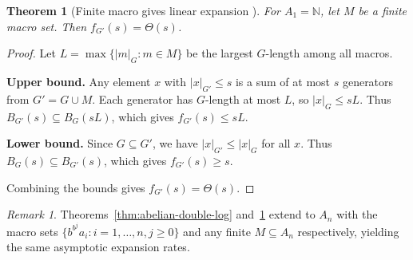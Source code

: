\documentclass[12pt]{amsart}
\newtheorem{theorem}{Theorem}
\theoremstyle{definition}
\theoremstyle{remark}
\newtheorem{remark}{Remark}
\begin{document}
\begin{theorem}[Finite macro gives linear expansion ]\label{thm:abelian-finite}
For $A_1 = \mathbb{N}$, let $M$ be a finite macro set.
Then $f_{G'}(s) = \Theta(s)$.
\end{theorem}

\begin{proof}
Let $L = \max\{|m|_G : m \in M\}$ be the largest $G$-length among all macros.

\textbf{Upper bound.}
Any element $x$ with $|x|_{G'} \leq s$ is a sum of at most $s$ generators from $G' = G \cup M$.
Each generator has $G$-length at most $L$, so $|x|_G \leq sL$.
Thus $B_{G'}(s) \subseteq B_G(sL)$, which gives $f_{G'}(s) \leq sL$.

\textbf{Lower bound.}
Since $G \subseteq G'$, we have $|x|_{G'} \leq |x|_G$ for all $x$.
Thus $B_G(s) \subseteq B_{G'}(s)$, which gives $f_{G'}(s) \geq s$.


Combining the bounds gives $f_{G'}(s) = \Theta(s)$.
\end{proof}

\begin{remark}
Theorems~\ref{thm:abelian-double-log} and~\ref{thm:abelian-finite} extend to $A_n$ with the macro sets $\{b^{b^j} a_i : i = 1, \ldots, n, j \geq 0\}$ and any finite $M \subseteq A_n$ respectively, yielding the same asymptotic expansion rates.
\end{remark}
\end{document}
